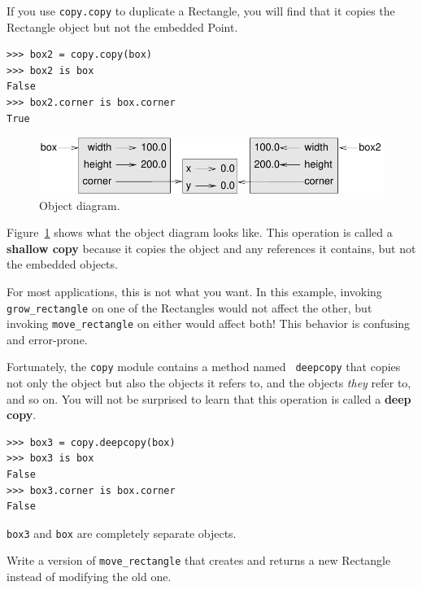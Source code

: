 \documentclass[10pt]{book}
\begin{document}
\begin{CJK}{UTF8}{gbsn}
If you use {\tt copy.copy} to duplicate a Rectangle, you will find
that it copies the Rectangle object but not the embedded Point.

\begin{verbatim}
>>> box2 = copy.copy(box)
>>> box2 is box
False
>>> box2.corner is box.corner
True
\end{verbatim}

\begin{figure}
\centerline
{\includegraphics[scale=0.8]{figs/rectangle2.pdf}}
\caption{Object diagram.}
\label{fig.rectangle2}
\end{figure}

Figure~\ref{fig.rectangle2} shows what the object diagram looks like.
This operation is called a {\bf shallow copy} because it copies the
object and any references it contains, but not the embedded objects.

For most applications, this is not what you want.  In this example,
invoking \verb"grow_rectangle" on one of the Rectangles would not
affect the other, but invoking \verb"move_rectangle" on either would
affect both!  This behavior is confusing and error-prone.

Fortunately, the {\tt copy} module contains a method named {\tt
deepcopy} that copies not only the object but also 
the objects it refers to, and the objects {\em they} refer to,
and so on.
You will not be surprised to learn that this operation is
called a {\bf deep copy}.

\begin{verbatim}
>>> box3 = copy.deepcopy(box)
>>> box3 is box
False
>>> box3.corner is box.corner
False
\end{verbatim}
%
{\tt box3} and {\tt box} are completely separate objects.


\begin{exercise}

Write a version of \verb"move_rectangle" that creates and
returns a new Rectangle instead of modifying the old one.


\end{exercise}
\end{CJK}
\end{document}
